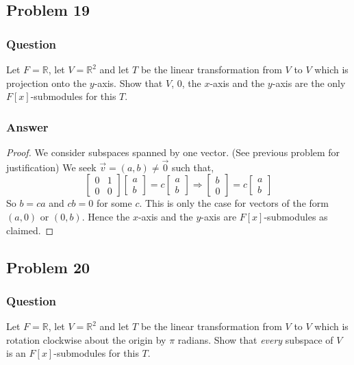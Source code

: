 \documentclass[12pt]{article}
\begin{document}
\subsection{Problem 19}

\subsubsection{Question}
Let $F = \mathbb{R}$, let $V = \mathbb{R}^2$ and let $T$ be the linear transformation from $V$ to $V$ which is projection onto the $y$-axis. Show that $V$, $0$, the $x$-axis and the $y$-axis are the only $F[x]$-submodules for this $T$.

\subsubsection{Answer}

\begin{proof}We consider subspaces spanned by one vector. (See previous problem for justification) We seek $\vec{v} = (a,b) \neq \vec{0}$ such that, 
\[\left[ \begin{array} {lr}0 & 1\\0 &0 \end{array} \right] \left[ \begin{array} {lr}a\\ b \end{array} \right] = c \left[ \begin{array} {lr}a \\b \end{array} \right] \Rightarrow  \left[ \begin{array} {lr}b \\0 \end{array} \right]  = c \left[ \begin{array} {lr}a \\b \end{array} \right]   \]
So $b = ca$ and $c b = 0$ for some $c$. This is only the case for vectors of the form $(a,0)$ or $(0,b)$. Hence the $x$-axis and the $y$-axis are  $F[x]$-submodules as claimed.
\end{proof}

\subsection{Problem 20}

\subsubsection{Question}
Let $F = \mathbb{R}$, let $V = \mathbb{R}^2$ and let $T$ be the linear transformation from $V$ to $V$ which is rotation clockwise about the origin by $\pi $ radians. Show that \emph{every} subspace of $V$ is an $F[x]$-submodules for this $T$.
\end{document}
